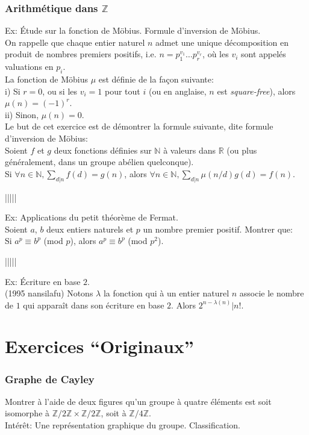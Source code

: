\documentclass{article}
\begin{document}
\section{Arithm\'etique dans $\mathbb{Z}$}
Ex: \'Etude sur la fonction de M\"obius. Formule d'inversion de M\"obius.\\
On rappelle que chaque entier naturel $n$ admet une unique d\'ecomposition en produit de nombres premiers positifs, i.e. $n=p_1^{v_1}\dots p_r^{v_r}$, o\`u les $v_i$ sont appel\'es valuations en $p_i$.\\
La fonction de M\"obius $\mu$ est d\'efinie de la fa\c con suivante:\\
i) Si $r=0$, ou si les $v_i=1$ pour tout $i$ (ou en anglaise, $n$ est \emph{square-free}), alors $\mu(n)=(-1)^r$.\\
ii) Sinon, $\mu(n)=0$.\\
Le but de cet exercice est de d\'emontrer la formule suivante, dite formule d'inversion de M\"obius:\\
Soient $f$ et $g$ deux fonctions d\'efinies sur $\mathbb{N}$ \`a valeurs dans $\mathbb{R}$ (ou plus g\'en\'eralement, dans un groupe ab\'elien quelconque).\\
Si $\forall n\in\mathbb{N}, \sum\limits_{d|n}f(d)=g(n)$, alors $\forall n\in\mathbb{N}, \sum\limits_{d|n}\mu(n/d)g(d)=f(n)$.
\begin{center}
|||||
\end{center}
Ex: Applications du petit th\'eor\`eme de Fermat.\\
Soient $a$, $b$ deux entiers naturels et $p$ un nombre premier positif. Montrer que:\\
Si $a^p\equiv b^p$ (mod $p$), alors $a^p\equiv b^p$ (mod $p^2$).
\begin{center}
|||||
\end{center}
Ex: \'Ecriture en base $2$.\\
(1995 nansilafu) Notons $\lambda$ la fonction qui \`a un entier naturel $n$ associe le nombre de $1$ qui appara\^it dans son \'ecriture en base $2$. Alors $2^{n-\lambda(n)}|n!$.

\part{Exercices ``Originaux''}
\section{Graphe de Cayley}
Montrer \`a l'aide de deux figures qu'un groupe \`a quatre \'el\'ements est soit isomorphe \`a $\mathbb{Z}/2\mathbb{Z}\times \mathbb{Z}/2\mathbb{Z}$, soit \`a $\mathbb{Z}/4\mathbb{Z}$.\\
Int\'er\^et: Une repr\'esentation graphique du groupe. Classification.
\end{document}
